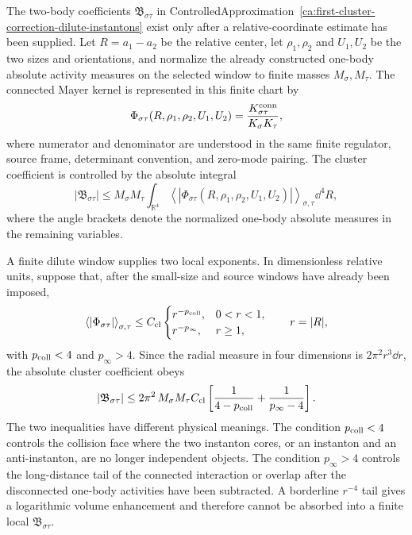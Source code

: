 \begin{controlledapproximation}
\label{ca:instanton-two-body-cluster-integrability}
The two-body coefficients
\(\mathfrak B_{\sigma\tau}\) in
ControlledApproximation~\ref{ca:first-cluster-correction-dilute-instantons}
exist only after a relative-coordinate estimate has been supplied.  Let
\(R=a_1-a_2\) be the relative center, let
\(\rho_1,\rho_2\) and \(U_1,U_2\) be the two sizes and orientations, and
normalize the already constructed one-body absolute activity measures on the
selected window to finite masses \(M_\sigma,M_\tau\).  The connected Mayer
kernel is represented in this finite chart by
\[
  \Phi_{\sigma\tau}
  (R,\rho_1,\rho_2,U_1,U_2)
  =
  \frac{
    K_{\sigma\tau}^{\rm conn}
  }{
    K_\sigma K_\tau
  },
\]
where numerator and denominator are understood in the same finite regulator,
source frame, determinant convention, and zero-mode pairing.  The cluster
coefficient is controlled by the absolute integral
\begin{equation}
  |\mathfrak B_{\sigma\tau}|
  \le
  M_\sigma M_\tau
  \int_{\mathbb R^4}
  \left\langle
    |\Phi_{\sigma\tau}(R,\rho_1,\rho_2,U_1,U_2)|
  \right\rangle_{\sigma,\tau}
  \dd^4R ,
  \label{eq:instanton-two-body-cluster-absolute-majorant}
\end{equation}
where the angle brackets denote the normalized one-body absolute measures in
the remaining variables.

A finite dilute window supplies two local exponents.  In dimensionless
relative units, suppose that, after the small-size and source windows have
already been imposed,
\begin{equation}
  \left\langle|\Phi_{\sigma\tau}|\right\rangle_{\sigma,\tau}
  \le
  C_{\rm cl}
  \begin{cases}
    r^{-p_{\rm coll}},&0<r<1,\\
    r^{-p_\infty},&r\ge1,
  \end{cases}
  \qquad r=|R|,
  \label{eq:instanton-two-body-cluster-majorant}
\end{equation}
with \(p_{\rm coll}<4\) and \(p_\infty>4\).  Since the radial measure in
four dimensions is \(2\pi^2r^3\dd r\), the absolute cluster coefficient obeys
\begin{equation}
  |\mathfrak B_{\sigma\tau}|
  \le
  2\pi^2\,M_\sigma M_\tau C_{\rm cl}
  \left[
    \frac1{4-p_{\rm coll}}
    +
    \frac1{p_\infty-4}
  \right].
  \label{eq:instanton-two-body-cluster-bound}
\end{equation}
The two inequalities have different physical meanings.  The condition
\(p_{\rm coll}<4\) controls the collision face where the two instanton cores,
or an instanton and an anti-instanton, are no longer independent objects.  The
condition \(p_\infty>4\) controls the long-distance tail of the connected
interaction or overlap after the disconnected one-body activities have been
subtracted.  A borderline \(r^{-4}\) tail gives a logarithmic volume
enhancement and therefore cannot be absorbed into a finite local
\(\mathfrak B_{\sigma\tau}\).


\end{controlledapproximation}
